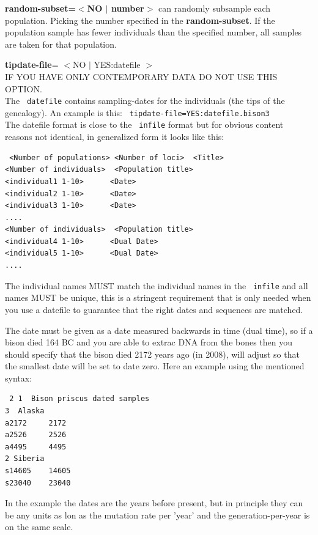 \begin{description}
\item \textbf{ random-subset=$<$NO $|$ number$>$}
\migrate can randomly subsample each population. Picking the number specified in the \textbf{ random-subset}. If the population sample has fewer individuals than the specified number, all samples are taken for that population.


\item\textbf{ tipdate-file}= $<$NO $|$ YES:datefile $>$ \\
IF YOU HAVE ONLY CONTEMPORARY DATA DO NOT USE THIS OPTION.\\
The \texttt{ datefile} contains sampling-dates for the individuals (the tips of the genealogy). An example is this: 
\texttt{ tipdate-file=YES:datefile.bison3}\\
The datefile format is close to the \texttt{ infile} format but for obvious content reasons not identical, in generalized form it looks like this:
 \begin{small}
 \begin{verbatim}
 <Number of populations> <Number of loci>  <Title>
<Number of individuals>  <Population title>
<individual1 1-10>      <Date>  
<individual2 1-10>      <Date>  
<individual3 1-10>      <Date>  
....
<Number of individuals>  <Population title>
<individual4 1-10>      <Dual Date>  
<individual5 1-10>      <Dual Date>  
....
\end{verbatim}
\end{small}
The individual names MUST match the individual names in the \texttt{ infile} and all names MUST be unique, this is a stringent requirement that is only needed when you use a datefile to guarantee that the right dates and sequences are matched. 

The date must be given as a date measured backwards in time (dual time), so if a bison died 164 BC and you are able to extrac DNA from the bones then you should specify that the bison died 2172 years ago (in 2008), \migrate will adjust so that the smallest date will be set to date zero. Here an example using the mentioned syntax:
 \begin{small}
 \begin{verbatim}
 2 1  Bison priscus dated samples
3  Alaska
a2172     2172  
a2526     2526  
a4495     4495  
2 Siberia
s14605    14605
s23040    23040
\end{verbatim}
\end{small}
In the example the dates are the years before present, but in principle they can be any units as lon as the mutation rate per 'year' and the generation-per-year is on the same scale.


\end{description}
